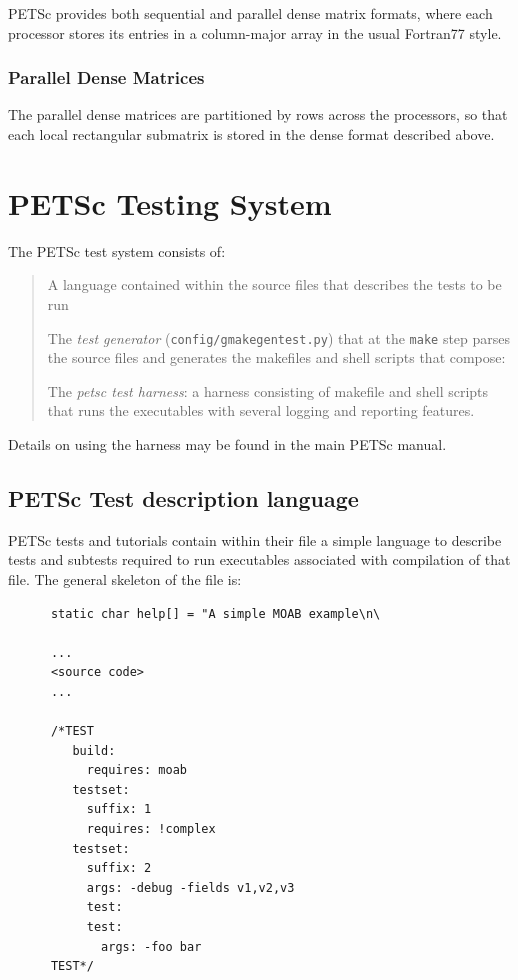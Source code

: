 PETSc provides both sequential and parallel dense matrix formats,
where each processor stores its entries in a column-major array in the
usual Fortran77 style.

\subsection{Parallel Dense Matrices}

The parallel dense matrices are partitioned by rows across the
processors, so that each local rectangular submatrix is stored in the
dense format described above.


\chapter{PETSc Testing System}
  \label{petsc-testing-system}


The PETSc test system consists of:
%
\begin{quote}
\begin{list}{.}
{
\setlength{\rightmargin}{\leftmargin}
}

\item A language contained within the source files that describes the
tests to be run

\item The \emph{test generator} (\lstinline{config/gmakegentest.py}) that at the
\lstinline{make} step parses the source files and generates the makefiles
and shell scripts that compose:

\item The \emph{petsc test harness}: a harness consisting of makefile and
shell scripts that runs the executables with several
logging and reporting features.
\end{list}

\end{quote}

Details on using the harness may be found in the main PETSc manual.

\section{PETSc Test description language%
  \label{petsc-test-description-language}%
}

PETSc tests and tutorials contain within their file a simple language to
describe tests and subtests required to run executables associated with
compilation of that file.  The general skeleton of the file is:
%
\begin{lstlisting}
      static char help[] = "A simple MOAB example\n\

      ...
      <source code>
      ...

      /*TEST
         build:
           requires: moab
         testset:
           suffix: 1
           requires: !complex
         testset:
           suffix: 2
           args: -debug -fields v1,v2,v3 
           test:
           test:
             args: -foo bar
      TEST*/

\end{lstlisting}

